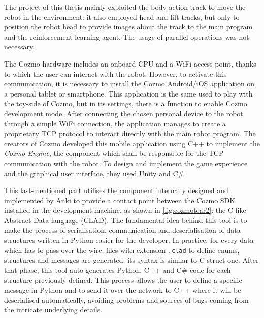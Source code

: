 The project of this thesis mainly exploited the body action track to move the robot in the environment: it also employed head and lift tracks, but only to position the robot head to provide images about the track to the main program and the reinforcement learning agent. The usage of parallel operations was not necessary.

The Cozmo hardware includes an onboard CPU and a WiFi access point, thanks to which the user can interact with the robot. However, to activate this communication, it is necessary to install the Cozmo Android/iOS application on a personal tablet or smartphone. This application is the same used to play with the toy-side of Cozmo, but in its settings, there is a function to enable Cozmo development mode.
After connecting the chosen personal device to the robot through a simple WiFi connection, the application manages to create a proprietary TCP protocol to interact directly with the main robot program.
The creators of Cozmo developed this mobile application using C++ to implement the \textit{Cozmo Engine}, the component which shall be responsible for the TCP communication with the robot. To design and implement the game experience and the graphical user interface, they used Unity and C\#.

This last-mentioned part utilises the component internally designed and implemented by Anki to provide a contact point between the Cozmo SDK installed in the development machine, as shown in \vref{fig:cozmotear2}: the C-like Abstract Data language (CLAD).
The fundamental idea behind this tool is to make the process of serialisation, communication and deserialisation of data structures written in Python easier for the developer. In practice, for every data which has to pass over the wire, files with extension \texttt{.clad} to define enums, structures and messages are generated: its syntax is similar to C struct one. After that phase, this tool auto-generates Python, C++ and C\# code for each structure previously defined. This process allows the user to define a specific message in Python and to send it over the network to C++ where it will be deserialised automatically, avoiding problems and sources of bugs coming from the intricate underlying details.

